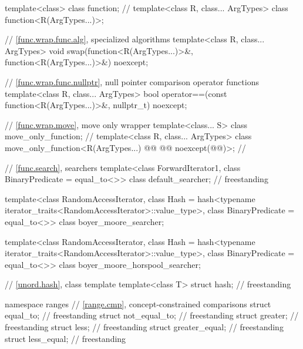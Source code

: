 \begin{codeblock}
{  template<class> class function;       // \notdef
  template<class R, class... ArgTypes> class function<R(ArgTypes...)>;

  // \ref{func.wrap.func.alg}, specialized algorithms
  template<class R, class... ArgTypes>
    void swap(function<R(ArgTypes...)>&, function<R(ArgTypes...)>&) noexcept;

  // \ref{func.wrap.func.nullptr}, null pointer comparison operator functions
  template<class R, class... ArgTypes>
    bool operator==(const function<R(ArgTypes...)>&, nullptr_t) noexcept;

  // \ref{func.wrap.move}, move only wrapper
  template<class... S> class move_only_function;        // \notdef
  template<class R, class... ArgTypes>
    class move_only_function<R(ArgTypes...) @\cv{}@ @@ noexcept(@@)>; // \seebelow

  // \ref{func.search}, searchers
  template<class ForwardIterator1, class BinaryPredicate = equal_to<>>
    class default_searcher;                                                         // freestanding

  template<class RandomAccessIterator,
           class Hash = hash<typename iterator_traits<RandomAccessIterator>::value_type>,
           class BinaryPredicate = equal_to<>>
    class boyer_moore_searcher;

  template<class RandomAccessIterator,
           class Hash = hash<typename iterator_traits<RandomAccessIterator>::value_type>,
           class BinaryPredicate = equal_to<>>
    class boyer_moore_horspool_searcher;

  // \ref{unord.hash}, class template 
  template<class T>
    struct hash;                                                                    // freestanding

  namespace ranges {
    // \ref{range.cmp}, concept-constrained comparisons
    struct equal_to;                                                                // freestanding
    struct not_equal_to;                                                            // freestanding
    struct greater;                                                                 // freestanding
    struct less;                                                                    // freestanding
    struct greater_equal;                                                           // freestanding
    struct less_equal;                                                              // freestanding
  }
}
\end{codeblock}

